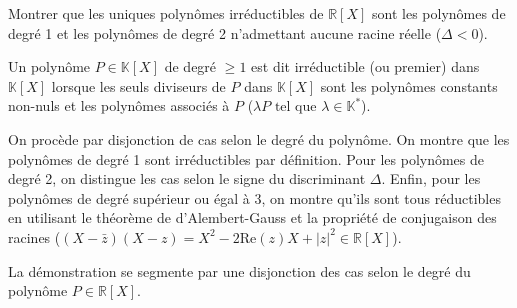 \documentclass[11pt, a4paper]{article}
\theoremstyle{definition}
\begin{document}
\clearpage

\begin{tcolorbox}[instructionstyle]
Montrer que les uniques polynômes irréductibles de $\mathbb{R}[X]$ sont les polynômes de degré 1 et les polynômes de degré 2 n'admettant aucune racine réelle ($\Delta < 0$).
\end{tcolorbox}

\begin{rappel}
	Un polynôme $P \in \mathbb{K}[X]$ de degré $\ge 1$ est dit irréductible (ou premier) dans $\mathbb{K}[X]$ lorsque les seuls diviseurs de $P$ dans $\mathbb{K}[X]$ sont les polynômes constants non-nuls et les polynômes associés à $P$ ($\lambda P \text{ tel que } \lambda \in \mathbb{K}^*$).
\end{rappel}

\begin{tcolorbox}[methodstyle]
	On procède par disjonction de cas selon le degré du polynôme. On montre que les polynômes de degré 1 sont irréductibles par définition. Pour les polynômes de degré 2, on distingue les cas selon le signe du discriminant $\Delta$. Enfin, pour les polynômes de degré supérieur ou égal à 3, on montre qu'ils sont tous réductibles en utilisant le théorème de d'Alembert-Gauss et la propriété de conjugaison des racines ($(X-\bar{z})(X-z) = X^2 - 2\text{Re}(z)X + |z|^2 \in \mathbb{R}[X]$).
\end{tcolorbox}

La démonstration se segmente par une disjonction des cas selon le degré du polynôme $P \in \mathbb{R}[X]$.
\end{document}
